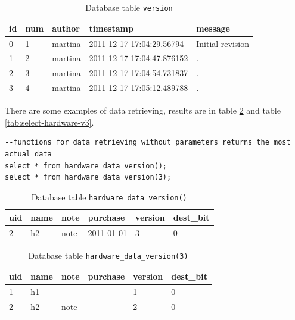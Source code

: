 \documentclass[deska]{subfiles}
\begin{document}
\begin{longtable}{ l | l | l | l | l }
    \caption{Database table {\tt version}}
    \label{tab:example-version} \\
    id & num & author & timestamp & message\\
    \hline
    \endhead
    0 & 1 & martina & 2011-12-17 17:04:29.56794 & Initial revision\\
    1 & 2 & martina & 2011-12-17 17:04:47.876152 & .\\
    2 & 3 & martina & 2011-12-17 17:04:54.731837 & .\\
    3 & 4 & martina & 2011-12-17 17:05:12.489788 & .\\
    \hline
\end{longtable}


There are some examples of data retrieving, results are in table \ref{tab:select-hardware} and table \ref{tab:select-hardware-v3}.\\

\begin{verbatim}
--functions for data retrieving without parameters returns the most actual data
select * from hardware_data_version();
select * from hardware_data_version(3);
\end{verbatim}

\begin{longtable}{ l | l | l | l | l | l }
    \caption{Database table {\tt hardware\_data\_version()}}
    \label{tab:select-hardware} \\
    uid & name & note & purchase & version & dest\_bit\\
    \hline
    \endhead
    2 & h2 & note & 2011-01-01 & 3 & 0\\
    \hline
\end{longtable}

\label{tab:select-hardware-v3}
\begin{longtable}{ l | l | l | l | l | l }
    \caption{Database table {\tt hardware\_data\_version(3)}} \\
    uid & name & note & purchase & version & dest\_bit\\
    \hline
    \endhead
    1 & h1 &  &  & 1 & 0\\
    2 & h2 & note &  & 2 & 0\\
    \hline
\end{longtable}
\end{document}
